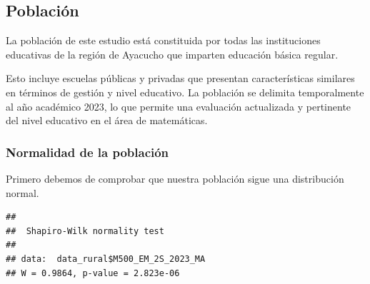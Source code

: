\documentclass[
]{article}
\newenvironment{Shaded}{\begin{snugshade}}{\end{snugshade}}
\newcommand{\FunctionTok}[1]{\textcolor[rgb]{0.13,0.29,0.53}{\textbf{#1}}}
\newcommand{\NormalTok}[1]{#1}
\newcommand{\OtherTok}[1]{\textcolor[rgb]{0.56,0.35,0.01}{#1}}
\newcommand{\SpecialCharTok}[1]{\textcolor[rgb]{0.81,0.36,0.00}{\textbf{#1}}}
\newcommand{\StringTok}[1]{\textcolor[rgb]{0.31,0.60,0.02}{#1}}
\begin{document}
\subsection*{Población}\label{poblaciuxf3n}

La población de este estudio está constituida por todas las
instituciones educativas de la región de Ayacucho que imparten educación
básica regular.

Esto incluye escuelas públicas y privadas que presentan características
similares en términos de gestión y nivel educativo. La población se
delimita temporalmente al año académico 2023, lo que permite una
evaluación actualizada y pertinente del nivel educativo en el área de
matemáticas.

\subsubsection*{Normalidad de la
población}\label{normalidad-de-la-poblaciuxf3n}

Primero debemos de comprobar que nuestra población sigue una
distribución normal.

\begin{Shaded}
\end{Shaded}

\begin{verbatim}
## 
##  Shapiro-Wilk normality test
## 
## data:  data_rural$M500_EM_2S_2023_MA
## W = 0.9864, p-value = 2.823e-06
\end{verbatim}
\end{document}
